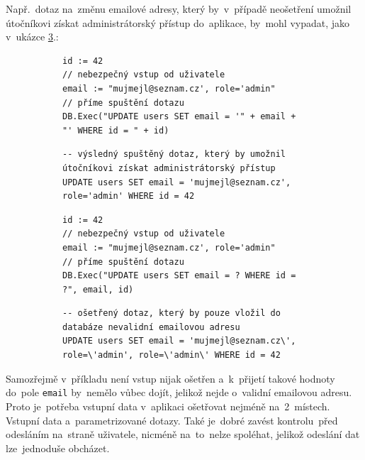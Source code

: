 \documentclass[14pt,a4paper]{article}
\begin{document}
            Např.~dotaz na~změnu emailové adresy, který by~v~případě neošetření umožnil útočníkovi získat administrátorský přístup do~aplikace, by~mohl vypadat, jako v~ukázce \ref{model-sql-injection}.:
            \begin{figure}
                \begin{subfigure}{0.48\textwidth}
                    \centering
                    \begin{verbatim}
id := 42
// nebezpečný vstup od uživatele
email := "mujmejl@seznam.cz', role='admin"
// příme spuštění dotazu
DB.Exec("UPDATE users SET email = '" + email + "' WHERE id = " + id)
                    \end{verbatim}
                    \begin{verbatim}
-- výsledný spuštěný dotaz, který by umožnil útočníkovi získat administrátorský přístup
UPDATE users SET email = 'mujmejl@seznam.cz', role='admin' WHERE id = 42
                    \end{verbatim}
                    \label{model-sql-injection}
                \end{subfigure}
                \begin{subfigure}{0.48\textwidth}
                    \centering
                    \begin{verbatim}
id := 42
// nebezpečný vstup od uživatele
email := "mujmejl@seznam.cz', role='admin"
// příme spuštění dotazu
DB.Exec("UPDATE users SET email = ? WHERE id = ?", email, id)
                    \end{verbatim}
                    \begin{verbatim}
-- ošetřený dotaz, který by pouze vložil do databáze nevalidní emailovou adresu
UPDATE users SET email = 'mujmejl@seznam.cz\', role=\'admin', role=\'admin\' WHERE id = 42
                    \end{verbatim}
                    \label{model-sql-injection}
                \end{subfigure}
            \end{figure}

            Samozřejmě v~příkladu není vstup nijak ošetřen a~k~přijetí takové hodnoty do~pole \texttt{email} by~nemělo vůbec dojít, jelikož nejde o~validní emailovou adresu. Proto je~potřeba vstupní data v~aplikaci ošetřovat nejméně na~2~místech. Vstupní data a~parametrizované dotazy. Také je~dobré zavést kontrolu~před odesláním na~straně uživatele, nicméně na~to~nelze spoléhat, jelikož odeslání dat lze~jednoduše obcházet.
            
\end{document}
